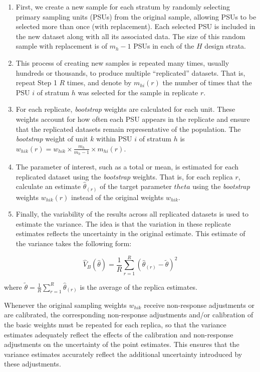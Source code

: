 \documentclass[
  12pt,
]{book}
\begin{document}
\begin{enumerate}
\def\labelenumi{\arabic{enumi}.}
\item
  First, we create a new sample for each stratum by randomly selecting primary sampling units (PSUs) from the original sample, allowing PSUs to be selected more than once (with replacement). Each selected PSU is included in the new dataset along with all its associated data. The size of this random sample with replacement is of \(m_h - 1\) PSUs in each of the \(H\) design strata.
\item
  This process of creating new samples is repeated many times, usually hundreds or thousands, to produce multiple ``replicated'' datasets. That is, repeat Step 1 \(R\) times, and denote by \(m_{hi}(r)\) the number of times that the PSU \(i\) of stratum \(h\) was selected for the sample in replicate \(r\).
\item
  For each replicate, \emph{bootstrap} weights are calculated for each unit. These weights account for how often each PSU appears in the replicate and ensure that the replicated datasets remain representative of the population. The \emph{bootstrap} weight of unit \(k\) within PSU \(i\) of stratum \(h\) is \(w_{hik}(r) = w_{hik} \times \frac {m_h}{m_h - 1} \times m_{hi}(r)\).
\item
  The parameter of interest, such as a total or mean, is estimated for each replicated dataset using the \emph{bootstrap} weights. That is, for each replica \(r\), calculate an estimate \(\widehat \theta_{(r)}\) of the target parameter \(theta\) using the \emph{bootstrap} weights \(w_{hik}(r)\) instead of the original weights \(w_{hik}\).
\item
  Finally, the variability of the results across all replicated datasets is used to estimate the variance. The idea is that the variation in these replicate estimates reflects the uncertainty in the original estimate. This estimate of the variance takes the following form:
\end{enumerate}

\[
\widehat V_{B} \left( \widehat \theta \right) = \frac {1} {R} \sum_{r=1}^R \left( \widehat \theta_{(r)} - \tilde \theta \right)^2
\]

where \(\tilde \theta = \frac 1 R \sum_{r=1}^R \widehat \theta_{(r)}\) is the average of the replica estimates.

Whenever the original sampling weights \(w_{hik}\) receive non-response adjustments or are calibrated, the corresponding non-response adjustments and/or calibration of the basic weights must be repeated for each replica, so that the variance estimates adequately reflect the effects of the calibration and non-response adjustments on the uncertainty of the point estimates. This ensures that the variance estimates accurately reflect the additional uncertainty introduced by these adjustments.
\end{document}
